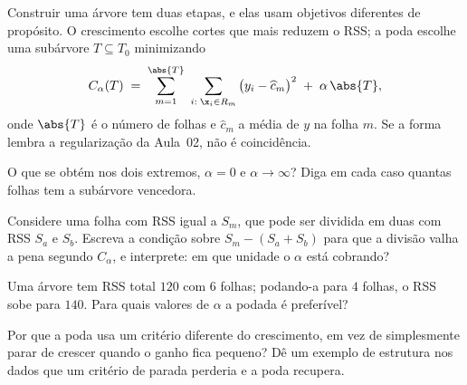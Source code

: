 Construir uma árvore tem duas etapas, e elas usam objetivos diferentes de
propósito. O crescimento escolhe cortes que mais reduzem o RSS; a poda escolhe uma
subárvore $T\subseteq T_0$ minimizando
\[
  C_\alpha(T) \;=\; \sum_{m=1}^{\abs{T}}\ \sum_{i:\;\x_i\in R_m}
    \big(y_i-\widehat c_m\big)^2 \;+\; \alpha\,\abs{T},
\]
onde $\abs{T}$ é o número de folhas e $\widehat c_m$ a média de $y$ na folha $m$.
Se a forma lembra a regularização da Aula~02, não é coincidência.
\begin{itens}
  \item {} O que se obtém nos dois extremos, $\alpha=0$ e
        $\alpha\to\infty$? Diga em cada caso quantas folhas tem a subárvore
        vencedora.
  \item {} Considere uma folha com RSS igual a $S_m$, que pode ser dividida
        em duas com RSS $S_a$ e $S_b$. Escreva a condição sobre
        $S_m-(S_a+S_b)$ para que a divisão valha a pena segundo $C_\alpha$, e
        interprete: em que unidade o $\alpha$ está cobrando?
  \item {} Uma árvore tem RSS total $120$ com $6$ folhas; podando-a para
        $4$ folhas, o RSS sobe para $140$. Para quais valores de $\alpha$ a podada
        é preferível?
  \item {} Por que a poda usa um critério diferente do crescimento, em vez
        de simplesmente parar de crescer quando o ganho fica pequeno? Dê um
        exemplo de estrutura nos dados que um critério de parada perderia e a poda
        recupera.
\end{itens}

